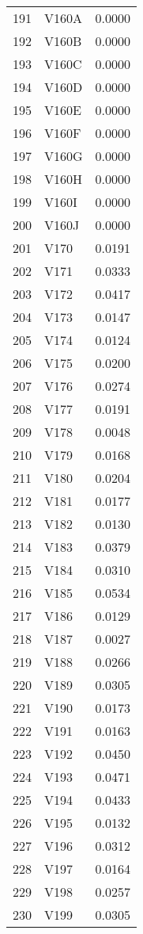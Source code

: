 \documentclass{amsart}
\begin{document}
\begin{longtable}{rlr}
  191 & V160A & 0.0000 \\ 
  192 & V160B & 0.0000 \\ 
  193 & V160C & 0.0000 \\ 
  194 & V160D & 0.0000 \\ 
  195 & V160E & 0.0000 \\ 
  196 & V160F & 0.0000 \\ 
  197 & V160G & 0.0000 \\ 
  198 & V160H & 0.0000 \\ 
  199 & V160I & 0.0000 \\ 
  200 & V160J & 0.0000 \\ 
  201 & V170 & 0.0191 \\ 
  202 & V171 & 0.0333 \\ 
  203 & V172 & 0.0417 \\ 
  204 & V173 & 0.0147 \\ 
  205 & V174 & 0.0124 \\ 
  206 & V175 & 0.0200 \\ 
  207 & V176 & 0.0274 \\ 
  208 & V177 & 0.0191 \\ 
  209 & V178 & 0.0048 \\ 
  210 & V179 & 0.0168 \\ 
  211 & V180 & 0.0204 \\ 
  212 & V181 & 0.0177 \\ 
  213 & V182 & 0.0130 \\ 
  214 & V183 & 0.0379 \\ 
  215 & V184 & 0.0310 \\ 
  216 & V185 & 0.0534 \\ 
  217 & V186 & 0.0129 \\ 
  218 & V187 & 0.0027 \\ 
  219 & V188 & 0.0266 \\ 
  220 & V189 & 0.0305 \\ 
  221 & V190 & 0.0173 \\ 
  222 & V191 & 0.0163 \\ 
  223 & V192 & 0.0450 \\ 
  224 & V193 & 0.0471 \\ 
  225 & V194 & 0.0433 \\ 
  226 & V195 & 0.0132 \\ 
  227 & V196 & 0.0312 \\ 
  228 & V197 & 0.0164 \\ 
  229 & V198 & 0.0257 \\ 
  230 & V199 & 0.0305 \\ 

\end{longtable}
\end{document}
